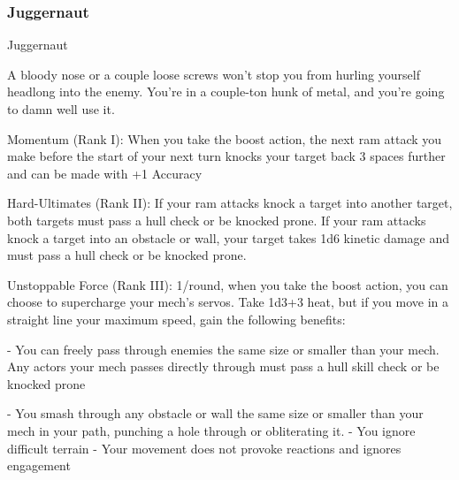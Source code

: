 \subsubsection{Juggernaut}

                                                Juggernaut

A bloody nose or a couple loose screws won’t stop you from hurling yourself headlong into the enemy.
You’re in a couple-ton hunk of metal, and you’re going to damn well use it.

Momentum (Rank I): When you take the boost action, the next ram attack you make before the
start of your next turn knocks your target back 3 spaces further and can be made with +1
Accuracy

Hard-Ultimates (Rank II): If your ram attacks knock a target into another target, both targets
must pass a hull check or be knocked prone. If your ram attacks knock a target into an obstacle
or wall, your target takes 1d6 kinetic damage and must pass a hull check or be knocked prone.

Unstoppable Force (Rank III): 1/round, when you take the boost action, you can choose to
supercharge your mech’s servos. Take 1d3+3 heat, but if you move in a straight line your
maximum speed, gain the following benefits:

             -    You can freely pass through enemies the same size or smaller than your mech.
                 Any actors your mech passes directly through must pass a hull skill check or be
                  knocked prone

             -    You smash through any obstacle or wall the same size or smaller than your mech
                  in your path, punching a hole through or obliterating it.
             -    You ignore difficult terrain
             -    Your movement does not provoke reactions and ignores engagement